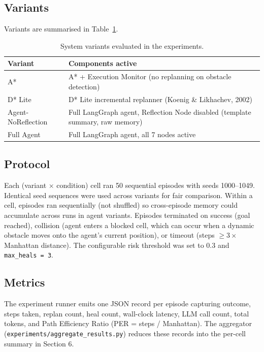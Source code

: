 \documentclass[11pt, letterpaper]{article}
\begin{document}
\subsection{Variants}
Variants are summarised in Table~\ref{tab:variants}.

\begin{table}[H]
    \centering
    \caption{System variants evaluated in the experiments.}
    \label{tab:variants}
    \begin{tabular}{p{} p{}}
        \toprule
        \textbf{Variant} & \textbf{Components active} \\
        \midrule
        A* & A* + Execution Monitor (no replanning on obstacle detection) \\
        D* Lite & D* Lite incremental replanner (Koenig \& Likhachev, 2002) \\
        Agent-NoReflection & Full LangGraph agent, Reflection Node disabled (template summary, raw memory) \\
        Full Agent & Full LangGraph agent, all 7 nodes active \\
        \bottomrule
    \end{tabular}
\end{table}

\subsection{Protocol}
Each (variant $\times$ condition) cell ran 50 sequential episodes with seeds 1000--1049. Identical seed sequences were used across variants for fair comparison. Within a cell, episodes ran sequentially (not shuffled) so cross-episode memory could accumulate across runs in agent variants. Episodes terminated on success (goal reached), collision (agent enters a blocked cell, which can occur when a dynamic obstacle moves onto the agent's current position), or timeout (steps $\geq 3 \times$ Manhattan distance). The configurable risk threshold was set to 0.3 and \texttt{max\_heals = 3}.

\subsection{Metrics}
The experiment runner emits one JSON record per episode capturing outcome, steps taken, replan count, heal count, wall-clock latency, LLM call count, total tokens, and Path Efficiency Ratio (PER = steps / Manhattan). The aggregator (\texttt{experiments/aggregate\_results.py}) reduces these records into the per-cell summary in Section 6.
\end{document}
